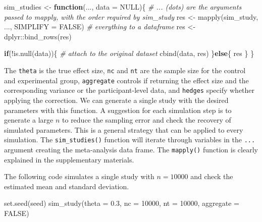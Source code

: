 \documentclass[
  man,floatsintext]{apa6}
\newenvironment{Shaded}{\begin{snugshade}}{\end{snugshade}}
\newcommand{\AttributeTok}[1]{\textcolor[rgb]{0.77,0.63,0.00}{#1}}
\newcommand{\CommentTok}[1]{\textcolor[rgb]{0.56,0.35,0.01}{\textit{#1}}}
\newcommand{\ConstantTok}[1]{\textcolor[rgb]{0.00,0.00,0.00}{#1}}
\newcommand{\ControlFlowTok}[1]{\textcolor[rgb]{0.13,0.29,0.53}{\textbf{#1}}}
\newcommand{\DecValTok}[1]{\textcolor[rgb]{0.00,0.00,0.81}{#1}}
\newcommand{\FloatTok}[1]{\textcolor[rgb]{0.00,0.00,0.81}{#1}}
\newcommand{\FunctionTok}[1]{\textcolor[rgb]{0.00,0.00,0.00}{#1}}
\newcommand{\NormalTok}[1]{#1}
\newcommand{\OtherTok}[1]{\textcolor[rgb]{0.56,0.35,0.01}{#1}}
\newcommand{\SpecialCharTok}[1]{\textcolor[rgb]{0.00,0.00,0.00}{#1}}
\begin{document}
\begin{Shaded}
\begin{Highlighting}[]
\NormalTok{sim\_studies }\OtherTok{\textless{}{-}} \ControlFlowTok{function}\NormalTok{(..., }\AttributeTok{data =} \ConstantTok{NULL}\NormalTok{)\{}
  \CommentTok{\# ... (dots) are the arguments passed to mapply, with the order required by sim\_study}
\NormalTok{  res }\OtherTok{\textless{}{-}} \FunctionTok{mapply}\NormalTok{(sim\_study, ..., }\AttributeTok{SIMPLIFY =} \ConstantTok{FALSE}\NormalTok{)}
  \CommentTok{\# everything to a dataframe}
\NormalTok{  res }\OtherTok{\textless{}{-}}\NormalTok{ dplyr}\SpecialCharTok{::}\FunctionTok{bind\_rows}\NormalTok{(res)}
  
  \ControlFlowTok{if}\NormalTok{(}\SpecialCharTok{!}\FunctionTok{is.null}\NormalTok{(data))\{}
    \CommentTok{\# attach to the original dataset}
    \FunctionTok{cbind}\NormalTok{(data, res)}
\NormalTok{  \}}\ControlFlowTok{else}\NormalTok{\{}
\NormalTok{    res}
\NormalTok{  \}}
\NormalTok{\}}
\end{Highlighting}
\end{Shaded}

\normalsize

The \texttt{theta} is the true effect size, \texttt{nc} and \texttt{nt} are the sample size for the control and experimental group, \texttt{aggregate} controls if returning the effect size and the corresponding variance or the participant-level data, and \texttt{hedges} specify whether applying the correction. We can generate a single study with the desired parameters with this function. A suggestion for each simulation step is to generate a large \(n\) to reduce the sampling error and check the recovery of simulated parameters. This is a general strategy that can be applied to every simulation. The \texttt{sim\_studies()} function will iterate through variables in the \texttt{...} argument creating the meta-analysis data frame. The \texttt{mapply()} function is clearly explained in the supplementary materials.

The following code simulates a single study with \(n = 10000\) and check the estimated mean and standard deviation.

\scriptsize

\begin{Shaded}
\begin{Highlighting}[]
\FunctionTok{set.seed}\NormalTok{(seed)}
\FunctionTok{sim\_study}\NormalTok{(}\AttributeTok{theta =} \FloatTok{0.3}\NormalTok{, }\AttributeTok{nc =} \DecValTok{10000}\NormalTok{, }\AttributeTok{nt =} \DecValTok{10000}\NormalTok{, }\AttributeTok{aggregate =} \ConstantTok{FALSE}\NormalTok{)}
\end{Highlighting}
\end{Shaded}
\end{document}
